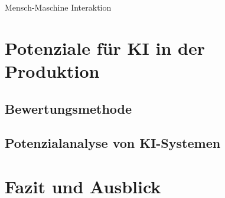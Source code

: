 \documentclass[a4paper,12pt, german]{report}
\begin{document}
Mensch-Maschine Interaktion

\chapter{Potenziale für KI in der Produktion}

\section{Bewertungsmethode}

\section{Potenzialanalyse von KI-Systemen}


\chapter{Fazit und Ausblick}

\listoffigures

\clearpage




\appendix
\end{document}
